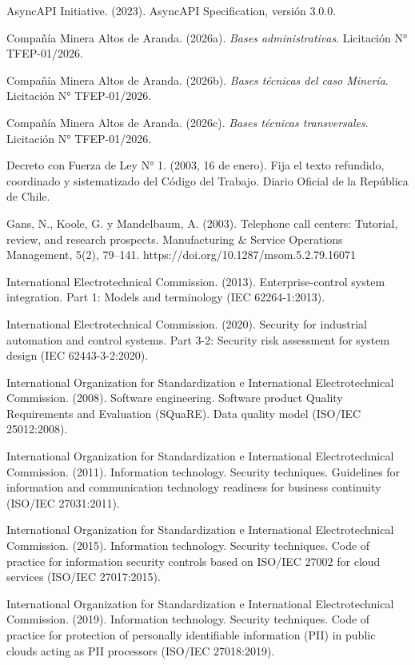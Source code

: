 \documentclass[formulario]{../../comun/overfore}
\begin{document}
\begin{referencias}
\item AsyncAPI Initiative. (2023). AsyncAPI Specification, versión 3.0.0.
\item Compañía Minera Altos de Aranda. (2026a). \emph{Bases administrativas}. Licitación N° TFEP-01/2026.
\item Compañía Minera Altos de Aranda. (2026b). \emph{Bases técnicas del caso Minería}. Licitación N° TFEP-01/2026.
\item Compañía Minera Altos de Aranda. (2026c). \emph{Bases técnicas transversales}. Licitación N° TFEP-01/2026.
\item Decreto con Fuerza de Ley N° 1. (2003, 16 de enero). Fija el texto refundido, coordinado y sistematizado del Código del Trabajo. Diario Oficial de la República de Chile.
\item Gans, N., Koole, G. y Mandelbaum, A. (2003). Telephone call centers: Tutorial, review, and research prospects. Manufacturing \& Service Operations Management, 5(2), 79–141. https://doi.org/10.1287/msom.5.2.79.16071
\item International Electrotechnical Commission. (2013). Enterprise-control system integration. Part 1: Models and terminology (IEC 62264-1:2013).
\item International Electrotechnical Commission. (2020). Security for industrial automation and control systems. Part 3-2: Security risk assessment for system design (IEC 62443-3-2:2020).
\item International Organization for Standardization e International Electrotechnical Commission. (2008). Software engineering. Software product Quality Requirements and Evaluation (SQuaRE). Data quality model (ISO/IEC 25012:2008).
\item International Organization for Standardization e International Electrotechnical Commission. (2011). Information technology. Security techniques. Guidelines for information and communication technology readiness for business continuity (ISO/IEC 27031:2011).
\item International Organization for Standardization e International Electrotechnical Commission. (2015). Information technology. Security techniques. Code of practice for information security controls based on ISO/IEC 27002 for cloud services (ISO/IEC 27017:2015).
\item International Organization for Standardization e International Electrotechnical Commission. (2019). Information technology. Security techniques. Code of practice for protection of personally identifiable information (PII) in public clouds acting as PII processors (ISO/IEC 27018:2019).

\end{referencias}
\end{document}

